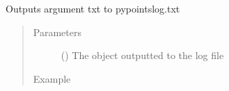 \documentclass[letterpaper,10pt,english]{sphinxmanual}
\begin{document}
\begin{fulllineitems}
\label{\detokenize{pypoints:pypoints.log}}
Outputs argument txt to pypointslog.txt
\begin{quote}\begin{description}
\item[{Parameters}] \leavevmode
{} () \textendash{} The object outputted to the log file

\item[{Example}] \leavevmode
\end{description}\end{quote}

\begin{sphinxVerbatim}[commandchars=\\\{\}]

 
\end{sphinxVerbatim}

\end{fulllineitems}

\end{document}
